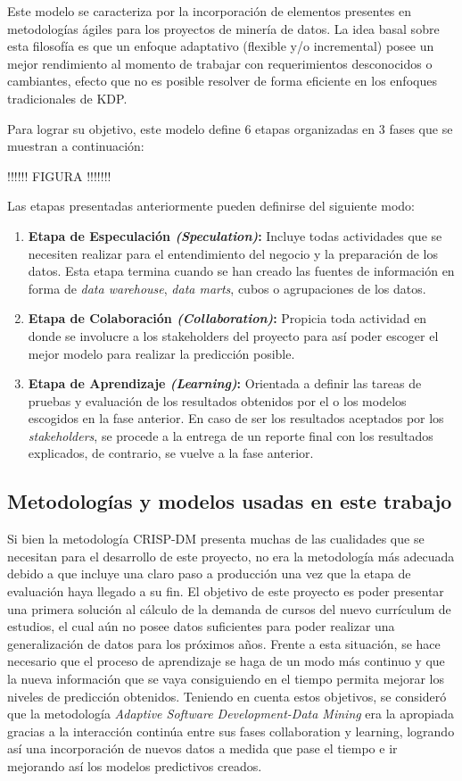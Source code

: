 Este modelo se caracteriza por la incorporación de elementos presentes en metodologías ágiles para los proyectos de minería de datos. La idea basal sobre esta filosofía es que un enfoque adaptativo (flexible y/o incremental) posee un mejor rendimiento al momento de trabajar con requerimientos desconocidos o cambiantes, efecto que no es posible resolver de forma eficiente en los enfoques tradicionales de KDP.

Para lograr su objetivo, este modelo \cite{knowledge_discovery} define 6 etapas organizadas en 3 fases que se muestran a continuación:

!!!!!! FIGURA !!!!!!!

Las etapas presentadas anteriormente pueden definirse del siguiente modo:

\begin{enumerate}
  \item \textbf{Etapa de Especulación \textit{(Speculation)}:} Incluye todas actividades que se necesiten realizar para el entendimiento del negocio y la preparación de los datos. Esta etapa termina cuando se han creado las fuentes de información en forma de \textit{data warehouse}, \textit{data marts}, cubos o agrupaciones de los datos.
  \item \textbf{Etapa de Colaboración \textit{(Collaboration)}:} Propicia toda actividad en donde se involucre a los stakeholders del proyecto para así poder escoger el mejor modelo para realizar la predicción posible.
  \item \textbf{Etapa de Aprendizaje \textit{(Learning)}:} Orientada a definir las tareas de pruebas y evaluación de los resultados obtenidos por el o los modelos escogidos en la fase anterior. En caso de ser los resultados aceptados por los \textit{stakeholders}, se procede a la entrega de un reporte final con los resultados explicados, de contrario, se vuelve a la fase anterior.
\end{enumerate}

\subsection{Metodologías y modelos usadas en este trabajo \label{sec:problem_categories}}

Si bien la metodología CRISP-DM presenta muchas de las cualidades que se necesitan para el desarrollo de este proyecto, no era la metodología más adecuada debido  a que incluye una claro paso a producción una vez que la etapa de evaluación haya llegado a su fin. El objetivo de este proyecto es poder presentar una primera solución al cálculo de la demanda de cursos del nuevo currículum de estudios, el cual aún no posee datos suficientes para poder realizar una generalización de datos para los próximos años. Frente a esta situación, se hace necesario que el proceso de aprendizaje se haga de un modo más continuo y que la nueva información que se vaya consiguiendo en el tiempo permita mejorar los niveles de predicción obtenidos. Teniendo en cuenta estos objetivos, se consideró que la metodología \textit{Adaptive Software Development-Data Mining} era la apropiada  gracias a la interacción continúa entre sus fases collaboration y learning, logrando así una incorporación de nuevos datos a medida que pase el tiempo e ir mejorando así los modelos predictivos creados.
